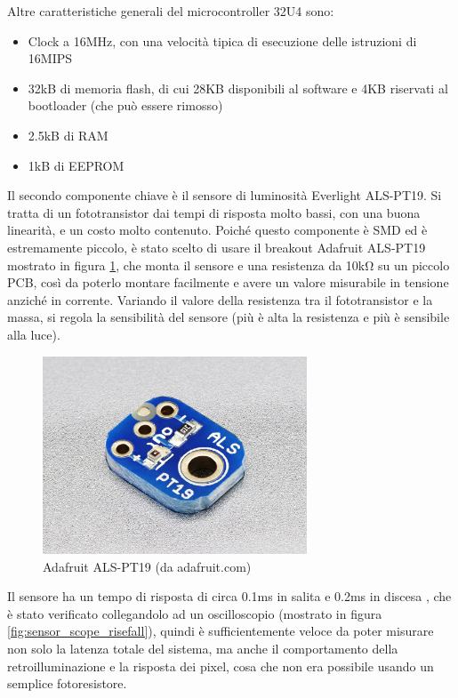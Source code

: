Altre caratteristiche generali del microcontroller 32U4 sono:
\begin{itemize}
	\item Clock a 16MHz, con una velocità tipica di esecuzione delle istruzioni di 16MIPS
	\item 32kB di memoria flash, di cui 28KB disponibili al software e 4KB riservati al bootloader (che può essere rimosso)
	\item 2.5kB di RAM
	\item 1kB di EEPROM
\end{itemize}

Il secondo componente chiave è il sensore di luminosità Everlight ALS-PT19. Si tratta di un fototransistor dai tempi di risposta molto bassi, con una buona linearità, e un costo molto contenuto. Poiché questo componente è SMD ed è estremamente piccolo, è stato scelto di usare il breakout Adafruit ALS-PT19 mostrato in figura \ref{fig:adafruit_pt19}, che monta il sensore e una resistenza da 10k\si{\ohm} su un piccolo PCB, così da poterlo montare facilmente e avere un valore misurabile in tensione anziché in corrente. Variando il valore della resistenza tra il fototransistor e la massa, si regola la sensibilità del sensore (più è alta la resistenza e più è sensibile alla luce).
\begin{figure}[h]
	\centering
	\includegraphics[width=0.7\textwidth]{Dispositivo_files/als-pt19.jpg}
	\caption{Adafruit ALS-PT19 (da adafruit.com)}
	\label{fig:adafruit_pt19}
\end{figure}

Il sensore ha un tempo di risposta di circa 0.1ms in salita e 0.2ms in discesa \cite{als_pt19_datasheet}, che è stato verificato collegandolo ad un oscilloscopio (mostrato in figura \ref{fig:sensor_scope_risefall}), quindi è sufficientemente veloce da poter misurare non solo la latenza totale del sistema, ma anche il comportamento della retroilluminazione e la risposta dei pixel, cosa che non era possibile usando un semplice fotoresistore.

